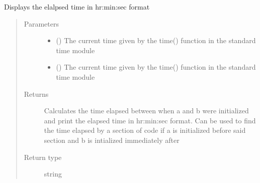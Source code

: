 \documentclass[letterpaper,10pt,english]{sphinxmanual}
\begin{document}
\begin{fulllineitems}
\label{\detokenize{index:su2.getTime}}
Displays the elalpsed time in hr:min:sec format
\begin{quote}\begin{description}
\item[{Parameters}] \leavevmode\begin{itemize}
\item {} 
 () \textendash{} The current time given by the time() function in the standard
time module

\item {} 
 () \textendash{} The current time given by the time() function in the standard
time module

\end{itemize}

\item[{Returns}] \leavevmode
Calculates the time elapsed between when a and b were
initialized and print the elapsed time in hr:min:sec format.
Can be used to find the time elapsed by a section of code if a
is initialized before said section and b is intialized
immediately after

\item[{Return type}] \leavevmode
string

\end{description}\end{quote}

\end{fulllineitems}

\end{document}
